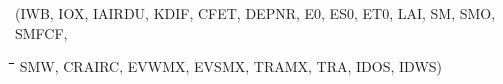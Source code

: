 \documentclass[11pt]{article}
\begin{document}
\begin{indenting}{3.81cm}
(IWB, IOX, IAIRDU, KDIF, CFET, DEPNR, E0, ES0, ET0, LAI, SM, SMO, SMFCF,
\end{indenting}
\begin{tabbing}
\hspace{1.27cm}\=\hspace{1.27cm}\=\hspace{1.27cm}\=\hspace{1.27cm}\=%
\hspace{1.27cm}\=\hspace{1.27cm}\=\hspace{1.27cm}\=\hspace{1.27cm}\=%
\hspace{1.27cm}\=\hspace{1.27cm}\=\kill
 \>\> \>  SMW, CRAIRC, EVWMX, EVSMX, TRAMX, TRA, IDOS, IDWS)
\end{tabbing}
\nwln
\end{document}

